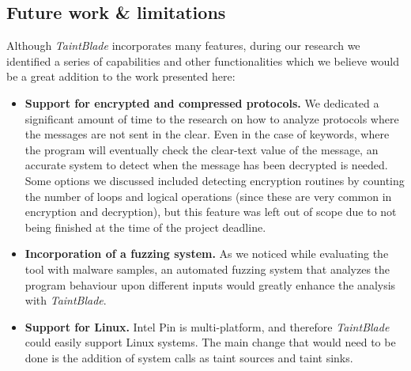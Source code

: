 \documentclass[conference]{IEEEtran}
\begin{document}
\subsection{Future work \& limitations}
Although \textit{TaintBlade} incorporates many features, during our research we
identified a series of capabilities and other functionalities which we believe
would be a great addition to the work presented here:
\begin{itemize}
    \item \textbf{Support for encrypted and compressed protocols.} We dedicated a significant
          amount of time to the research on how to analyze protocols where the messages
          are not sent in the clear. Even in the case of keywords, where the program will
          eventually check the clear-text value of the message, an accurate system to
          detect when the message has been decrypted is needed. Some options we discussed
          included detecting encryption routines by counting the number of loops and
          logical operations (since these are very common in encryption and decryption),
          but this feature was left out of scope due to not being finished at the time of the 
          project deadline.
    \item \textbf{Incorporation of a fuzzing system.} As we noticed while evaluating the tool with
          malware samples, an automated fuzzing system that analyzes the program
          behaviour upon different inputs would greatly enhance the analysis with
          \textit{TaintBlade}.
    \item \textbf{Support for Linux.} Intel Pin is multi-platform, and therefore
          \textit{TaintBlade} could easily support Linux systems. The main change that
          would need to be done is the addition of system calls as taint sources and
          taint sinks.
\end{itemize}
\end{document}
